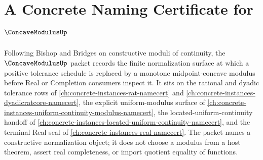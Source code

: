 \chapter{A Concrete Naming Certificate for $\ConcaveModulusUp$}
\label{ch:concrete-instances-concave-modulus-namecert}

Following Bishop and Bridges on constructive moduli of continuity, the $\ConcaveModulusUp$ packet records the finite normalization surface at which a positive tolerance schedule is replaced by a monotone midpoint-concave modulus before Real or Completion consumers inspect it. It sits on the rational and dyadic tolerance rows of \autoref{ch:concrete-instances-rat-namecert} and \autoref{ch:concrete-instances-dyadicratcore-namecert}, the explicit uniform-modulus surface of \autoref{ch:concrete-instances-uniform-continuity-modulus-namecert}, the located-uniform-continuity handoff of \autoref{ch:concrete-instances-located-uniform-continuity-namecert}, and the terminal Real seal of \autoref{ch:concrete-instances-real-namecert}. The packet names a constructive normalization object; it does not choose a modulus from a host theorem, assert real completeness, or import quotient equality of functions.

